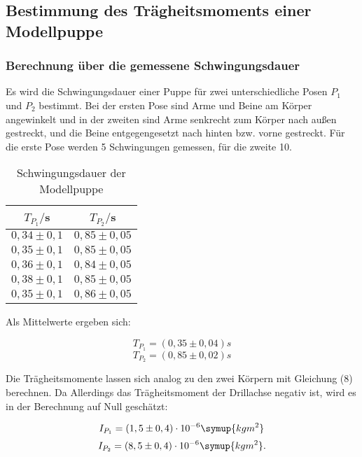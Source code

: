 \subsection{Bestimmung des Trägheitsmoments einer Modellpuppe}
\subsubsection{Berechnung über die gemessene Schwingungsdauer}
Es wird die Schwingungsdauer einer Puppe für zwei unterschiedliche 
Posen $P_\text{1}$ und $P_\text{2}$ bestimmt. Bei der ersten Pose sind Arme und Beine am Körper angewinkelt und in der zweiten
sind Arme senkrecht zum Körper nach außen gestreckt, und die Beine entgegengesetzt nach hinten bzw. vorne gestreckt.
Für die erste Pose werden 5 Schwingungen gemessen, für die zweite 10.
\begin{table}[H]
  \centering
  \caption{Schwingungsdauer der Modellpuppe}
  \label{tab:Schwingungsdauer der Modellpuppe}
  \begin{tabular}{c c}
    \toprule
    $T_{P_1}/$s & $T_{P_2}/$s \\
    \midrule
    $0,34 \pm 0,1$ & $0,85 \pm 0,05$ \\
    $0,35 \pm 0,1$ & $0,85 \pm 0,05$ \\
    $0,36 \pm 0,1$ & $0,84 \pm 0,05$ \\
    $0,38 \pm 0,1$ & $0,85 \pm 0,05$ \\
    $0,35 \pm 0,1$ & $0,86 \pm 0,05$ \\
    \bottomrule
  \end{tabular}
\end{table}

Als Mittelwerte ergeben sich:

\begin{equation}
T_{P_1} = (0,35 \pm 0,04) s
\end{equation}
\begin{equation}
T_{P_2}= (0,85 \pm 0,02) s
\end{equation}

Die Trägheitsmomente lassen sich analog zu den zwei Körpern mit Gleichung (8) berechnen.
Da Allerdings das Trägheitsmoment der Drillachse negativ ist, wird es in der Berechnung auf Null geschätzt:

\begin{equation}
I_{P_1}  = (1,5 \pm 0,4)\cdot 10^{-6} \symup{kgm^2} 
\end{equation}
\begin{equation}
I_{P_2}  = (8,5 \pm 0,4)\cdot 10^{-6} \symup{kgm^2} .
\end{equation}

